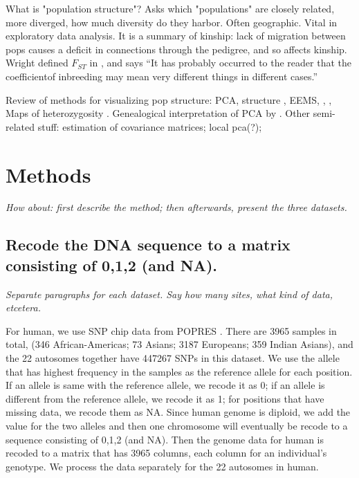 \documentclass[11pt, oneside]{article}   	%
\newcommand{\plr}[1]{{\em \color{blue} #1}}
\begin{document}
What is "population structure"?
Asks which "populations" are closely related, more diverged, how much diversity do they harbor.
Often geographic.
Vital in exploratory data analysis.
It is a summary of kinship: 
lack of migration between pops causes a deficit in connections through the pedigree,
and so affects kinship.
Wright defined $F_{ST}$ in \citep{wright1949genetical}, and says ``It has probably occurred to the reader that the coefficientof inbreeding may mean very different
things in different cases.''

Review of methods for visualizing pop structure:
PCA, structure \citep{falush2003inference}, EEMS, \citep{petkova2014visualizing}, \citep{yang2012modelbased},
Maps of heterozygosity \citep{ramachandran2005support}.
Genealogical interpretation of PCA by \citet{mcvean2009genealogical}.
Other semi-related stuff:
estimation of covariance matrices;
local pca(?);



\section{Methods}

\plr{How about: first describe the method; then afterwards, present the three datasets.}

\subsection{Recode the DNA sequence to a matrix consisting of 0,1,2 (and NA).}

\plr{Separate paragraphs for each dataset. Say how many sites, what kind of data, etcetera.}

For human, we use SNP chip data from POPRES \citet{nelson2008population}. There are 3965 samples in total, (346 African-Americas; 73 Asians; 3187 Europeans; 359 Indian Asians), and the 22 autosomes together have 447267 SNPs in this dataset. 
We use the allele that has highest frequency in the samples as the reference allele for each position. 
If an allele is same with the reference allele, we recode it as 0; if an allele is different from the reference allele, we recode it as 1; for positions that have missing data, we recode them as NA. 
Since human genome is diploid, we add the value for the two alleles and then one chromosome will eventually be recode to a sequence consisting of 0,1,2 (and NA).
Then the genome data for human is recoded to a matrix that has 3965 columns, each column for an individual's genotype. 
We process the data separately for the 22 autosomes in human.
\end{document}
